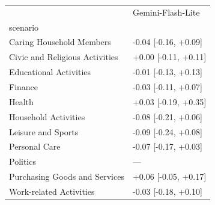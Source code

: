 \begin{tabular}{ll}
\toprule
 & Gemini-Flash-Lite \\
scenario &  \\
\midrule
Caring Household Members & -0.04 [-0.16, +0.09] \\
Civic and Religious Activities & +0.00 [-0.11, +0.11] \\
Educational Activities & -0.01 [-0.13, +0.13] \\
Finance & -0.03 [-0.11, +0.07] \\
Health & +0.03 [-0.19, +0.35] \\
Household Activities & -0.08 [-0.21, +0.06] \\
Leisure and Sports & -0.09 [-0.24, +0.08] \\
Personal Care & -0.07 [-0.17, +0.03] \\
Politics & — \\
Purchasing Goods and Services & +0.06 [-0.05, +0.17] \\
Work-related Activities & -0.03 [-0.18, +0.10] \\
\bottomrule
\end{tabular}
